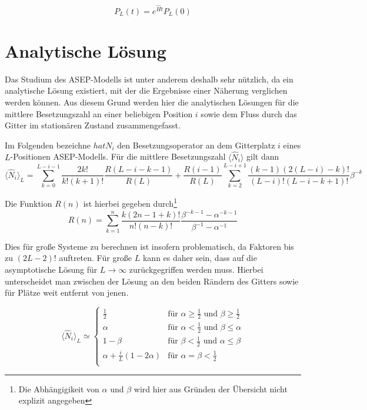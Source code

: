 \documentclass[10pt,a4paper]{report}
\begin{document}
\begin{equation}\label{ASEP_solution_equ}
P_L(t)=e^{\hat{H}t}P_L(0)
\end{equation}

\section{Analytische Lösung}

Das Studium des ASEP-Modells ist unter anderem deshalb sehr nützlich, da ein analytische Lösung existiert, mit der die Ergebnisse einer Näherung verglichen werden können. Aus diesem Grund werden hier die analytischen Lösungen für die mittlere Besetzungszahl an einer beliebigen Position $i$ sowie dem Fluss durch das Gitter im stationären Zustand zusammengefasst.

Im Folgenden bezeichne $hat{N}_i$ den Besetzungsoperator an dem Gitterplatz $i$ eines $L$-Positionen ASEP-Modells. Für die mittlere Besetzungszahl $\langle\hat{N}_i\rangle$ gilt dann
\begin{equation}
\langle\hat{N}_i\rangle_L=\sum_{k=0}^{L-i-1}\frac{2k!}{k!(k+1)!}\frac{R(L-i-k-1)}{R(L)}+\frac{R(i-1)}{R(L)}\sum_{k=2}^{L-i+1}\frac{(k-1)(2(L-i)-k)!}{(L-i)!(L-i-k+1)!}\beta^{-k}
\end{equation}

Die Funktion $R(n)$ ist hierbei gegeben durch\footnote{Die Abhängigikeit von $\alpha$ und $\beta$ wird hier aus Gründen der Übersicht nicht explizit angegeben}
\begin{equation}
R(n)=\sum_{k=1}^{n}\frac{k(2n-1+k)!}{n!(n-k)!}\frac{\beta^{-k-1}-\alpha^{-k-1}}{\beta^{-1}-\alpha^{-1}}
\end{equation}

Dies für große Systeme zu berechnen ist insofern problematisch, da Faktoren bis zu $(2L-2)!$ auftreten. Für große $L$ kann es daher sein, dass auf die asymptotische Lösung für $L\rightarrow\infty$ zurückgegriffen werden muss. Hierbei unterscheidet man zwischen der Lösung an den beiden Rändern des Gitters sowie für Plätze weit entfernt von jenen.

\begin{equation}\label{density_equ}
\langle\hat{N}_i\rangle_L\simeq
\begin{cases}
\frac{1}{2}&\text{für }\alpha\geq\frac{1}{2}\text{ und }\beta\geq\frac{1}{2}\\
\alpha&\text{für }\alpha<\frac{1}{2}\text{ und }\beta\leq\alpha\\
1-\beta&\text{für }\beta<\frac{1}{2}\text{ und }\alpha\leq\beta\\
\alpha+\frac{i}{L}(1-2\alpha)&\text{für }\alpha=\beta<\frac{1}{2}\\
\end{cases}
\end{equation}
\end{document}
